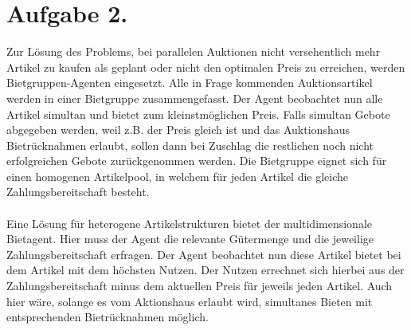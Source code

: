\documentclass[a4paper]{article}
\begin{document}
\section*{Aufgabe 2.}

	Zur Lösung des Problems, bei parallelen Auktionen nicht versehentlich mehr Artikel zu kaufen als geplant oder nicht den optimalen Preis zu erreichen, werden Bietgruppen-Agenten eingesetzt. Alle in Frage kommenden Auktionsartikel werden in einer Bietgruppe zusammengefasst.
	Der Agent beobachtet nun alle Artikel simultan und bietet zum kleinstmöglichen Preis. Falls  simultan Gebote abgegeben werden, weil z.B. der Preis gleich ist und das Auktionshaus Bietrücknahmen erlaubt, sollen dann bei Zuschlag die restlichen noch nicht erfolgreichen Gebote zurückgenommen werden. Die Bietgruppe eignet sich für einen homogenen Artikelpool, in welchem für jeden Artikel die gleiche Zahlungsbereitschaft besteht.\\\\
	Eine Lösung für heterogene Artikelstrukturen bietet der multidimensionale Bietagent. Hier muss der Agent die relevante Gütermenge und die jeweilige Zahlungsbereitschaft erfragen. Der Agent beobachtet nun diese Artikel bietet bei dem Artikel mit dem höchsten Nutzen. Der Nutzen errechnet sich hierbei aus der Zahlungsbereitschaft minus dem aktuellen Preis für jeweils jeden Artikel. Auch hier wäre, solange es vom Aktionshaus erlaubt wird, simultanes Bieten mit entsprechenden Bietrücknahmen möglich.
\end{document}
